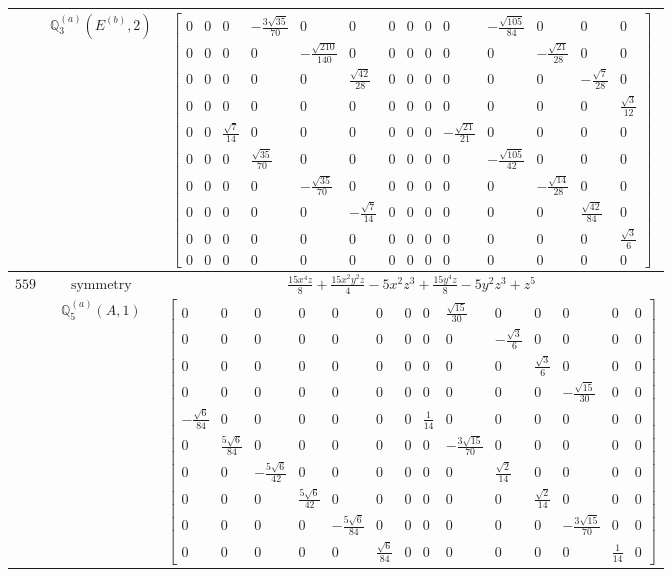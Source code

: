 \documentclass[fleqn,8pt,landscape]{jsarticle}
\begin{document}
\begin{longtable}{ccc}
$  $ & $ \mathbb{Q}_{3}^{(a)}(E^{(b)},2) $ & $ \begin{bmatrix} 0 & 0 & 0 & - \frac{3 \sqrt{35}}{70} & 0 & 0 & 0 & 0 & 0 & 0 & - \frac{\sqrt{105}}{84} & 0 & 0 & 0 \\ 0 & 0 & 0 & 0 & - \frac{\sqrt{210}}{140} & 0 & 0 & 0 & 0 & 0 & 0 & - \frac{\sqrt{21}}{28} & 0 & 0 \\ 0 & 0 & 0 & 0 & 0 & \frac{\sqrt{42}}{28} & 0 & 0 & 0 & 0 & 0 & 0 & - \frac{\sqrt{7}}{28} & 0 \\ 0 & 0 & 0 & 0 & 0 & 0 & 0 & 0 & 0 & 0 & 0 & 0 & 0 & \frac{\sqrt{3}}{12} \\ 0 & 0 & \frac{\sqrt{7}}{14} & 0 & 0 & 0 & 0 & 0 & 0 & - \frac{\sqrt{21}}{21} & 0 & 0 & 0 & 0 \\ 0 & 0 & 0 & \frac{\sqrt{35}}{70} & 0 & 0 & 0 & 0 & 0 & 0 & - \frac{\sqrt{105}}{42} & 0 & 0 & 0 \\ 0 & 0 & 0 & 0 & - \frac{\sqrt{35}}{70} & 0 & 0 & 0 & 0 & 0 & 0 & - \frac{\sqrt{14}}{28} & 0 & 0 \\ 0 & 0 & 0 & 0 & 0 & - \frac{\sqrt{7}}{14} & 0 & 0 & 0 & 0 & 0 & 0 & \frac{\sqrt{42}}{84} & 0 \\ 0 & 0 & 0 & 0 & 0 & 0 & 0 & 0 & 0 & 0 & 0 & 0 & 0 & \frac{\sqrt{3}}{6} \\ 0 & 0 & 0 & 0 & 0 & 0 & 0 & 0 & 0 & 0 & 0 & 0 & 0 & 0 \end{bmatrix} $ \\ \hline
$ 559 $ & $ \text{symmetry} $ & $ \frac{15 x^{4} z}{8} + \frac{15 x^{2} y^{2} z}{4} - 5 x^{2} z^{3} + \frac{15 y^{4} z}{8} - 5 y^{2} z^{3} + z^{5} $ \\
$  $ & $ \mathbb{Q}_{5}^{(a)}(A,1) $ & $ \begin{bmatrix} 0 & 0 & 0 & 0 & 0 & 0 & 0 & 0 & \frac{\sqrt{15}}{30} & 0 & 0 & 0 & 0 & 0 \\ 0 & 0 & 0 & 0 & 0 & 0 & 0 & 0 & 0 & - \frac{\sqrt{3}}{6} & 0 & 0 & 0 & 0 \\ 0 & 0 & 0 & 0 & 0 & 0 & 0 & 0 & 0 & 0 & \frac{\sqrt{3}}{6} & 0 & 0 & 0 \\ 0 & 0 & 0 & 0 & 0 & 0 & 0 & 0 & 0 & 0 & 0 & - \frac{\sqrt{15}}{30} & 0 & 0 \\ - \frac{\sqrt{6}}{84} & 0 & 0 & 0 & 0 & 0 & 0 & \frac{1}{14} & 0 & 0 & 0 & 0 & 0 & 0 \\ 0 & \frac{5 \sqrt{6}}{84} & 0 & 0 & 0 & 0 & 0 & 0 & - \frac{3 \sqrt{15}}{70} & 0 & 0 & 0 & 0 & 0 \\ 0 & 0 & - \frac{5 \sqrt{6}}{42} & 0 & 0 & 0 & 0 & 0 & 0 & \frac{\sqrt{2}}{14} & 0 & 0 & 0 & 0 \\ 0 & 0 & 0 & \frac{5 \sqrt{6}}{42} & 0 & 0 & 0 & 0 & 0 & 0 & \frac{\sqrt{2}}{14} & 0 & 0 & 0 \\ 0 & 0 & 0 & 0 & - \frac{5 \sqrt{6}}{84} & 0 & 0 & 0 & 0 & 0 & 0 & - \frac{3 \sqrt{15}}{70} & 0 & 0 \\ 0 & 0 & 0 & 0 & 0 & \frac{\sqrt{6}}{84} & 0 & 0 & 0 & 0 & 0 & 0 & \frac{1}{14} & 0 \end{bmatrix} $ \\ \hline

\end{longtable}
\end{document}
